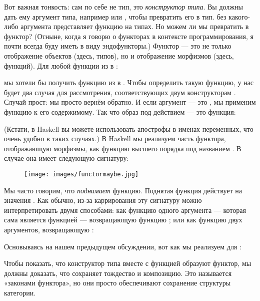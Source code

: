 Вот важная тонкость:  сам по себе не тип, это \emph{конструктор типа}. Вы должны дать ему аргумент типа, например  или , чтобы превратить его в тип.  без какого-либо аргумента представляет функцию на типах. Но можем ли мы превратить  в функтор? (Отныне, когда я говорю о функторах в контексте программирования, я почти всегда буду иметь в виду эндофункторы.) Функтор — это не только отображение объектов (здесь, типов), но и отображение морфизмов (здесь, функций). Для любой функции из  в :

мы хотели бы получить функцию из  в . Чтобы определить такую функцию, у нас будет два случая для рассмотрения, соответствующих двум конструкторам . Случай  прост: мы просто вернём  обратно. И если аргумент — это , мы применим функцию  к его содержимому. Так что образ  под действием  — это функция:

(Кстати, в Haskell вы можете использовать апострофы в именах переменных, что очень удобно в таких случаях.) В Haskell мы реализуем часть функтора, отображающую морфизмы, как функцию высшего порядка под названием . В случае  она имеет следующую сигнатуру:


\begin{figure}[H]
  \centering
  \texttt{[image: images/functormaybe.jpg]}
\end{figure}

\noindent
Мы часто говорим, что  \emph{поднимает} функцию. Поднятая функция действует на значения . Как обычно, из-за каррирования эту сигнатуру можно интерпретировать двумя способами: как функцию одного аргумента — которая сама является функцией  — возвращающую функцию ; или как функцию двух аргументов, возвращающую :

Основываясь на нашем предыдущем обсуждении, вот как мы реализуем  для :

Чтобы показать, что конструктор типа  вместе с функцией  образуют функтор, мы должны доказать, что  сохраняет тождество и композицию. Это называется «законами функтора», но они просто обеспечивают сохранение структуры категории.

